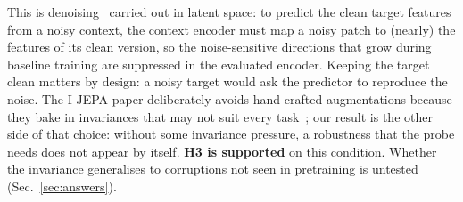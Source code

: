 \interp This is denoising~\cite{vincent2008denoising} carried out in latent space: to predict the clean target features from
a noisy context, the context encoder must map a noisy patch to (nearly) the features of its clean version, so the
noise-sensitive directions that grow during baseline training are suppressed in the evaluated encoder. Keeping the target
clean matters by design: a noisy target would ask the predictor to reproduce the noise. The I-JEPA paper deliberately avoids
hand-crafted augmentations because they bake in invariances that may not suit every task~\cite[Sec.~1]{assran2023ijepa}; our
result is the other side of that choice: without some invariance pressure, a robustness that the probe needs does not appear
by itself. \textbf{H3 is supported} on this condition. Whether the invariance generalises to corruptions not seen in
pretraining is untested (Sec.~\ref{sec:answers}).

